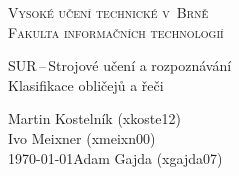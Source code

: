 \documentclass[a4paper,11pt]{article}
\begin{document}
	\begin{titlepage}
		\begin{center}
			\textsc{\Huge Vysoké učení technické v~Brně\\
				\vspace{0.4em}\huge Fakulta informačních technologií}
			
			
			{\LARGE SUR\,--\,Strojové učení a rozpoznávání\\
				\Huge Klasifikace obličejů a řeči\\ \vspace{0.3em}}
			
			
			{\Large \hfill Martin Kostelník (xkoste12)}\\
			{\Large \hfill Ivo Meixner (xmeixn00)}\\
			{\Large \today \hfill Adam Gajda (xgajda07)}
		\end{center}
	\end{titlepage}
\end{document}
